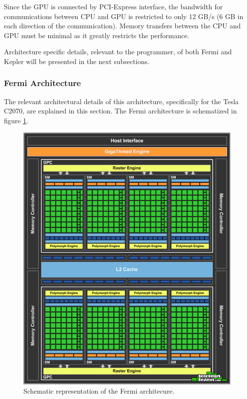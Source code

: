 Since the GPU is connected by PCI-Express interface, the bandwidth for communications between CPU and GPU is restricted to only 12 GB/s (6 GB in each direction of the communication). Memory transfers between the CPU and GPU must be minimal as it greatly restricts the performance.

Architecture specific details, relevant to the programmer, of both Fermi and Kepler will be presented in the next subsections.

\subsubsection{\nvidia Fermi Architecture}

The relevant architectural details of this architecture, specifically for the Tesla C2070, are explained in this section. The Fermi architecture is schematized in figure \ref{fig:fermi}.

\begin{figure}[!htp]
	\begin{center}
		\includegraphics[scale=0.25]{../../common/img/fermi_arch.png}
		\caption{Schematic representation of the \nvidia Fermi architecure.}
		\label{fig:fermi}
	\end{center}
\end{figure}


